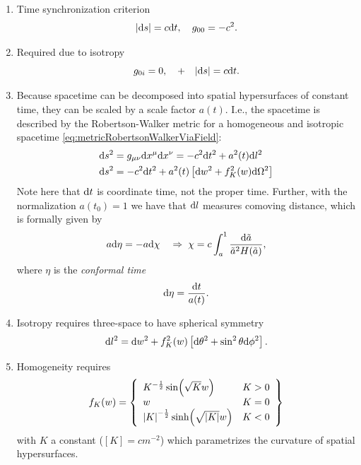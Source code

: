 \begin{enumerate}
	\item Time synchronization criterion \begin{equation}
		\abs{\mathrm{d} s}= c\mathrm{d} t,\quad g_{00} = - c^2.
	\end{equation}
	\item Required due to isotropy
	\begin{equation}
		g_{0i} = 0,\quad +\quad \abs{\mathrm{d} s}=c \mathrm{d} t.
	\end{equation}
	\item Because spacetime can be decomposed into spatial hypersurfaces of constant time, they can be scaled by a scale factor $a(t)$. I.e., the spacetime is described by the Robertson-Walker metric for a homogeneous and isotropic spacetime \ref{eq:metricRobertsonWalkerViaField}:
	\begin{align}
		\mathrm{d} s^2 &= g_{\mu \nu} \mathrm{d} x^\mu \mathrm{d} x^\nu = -c^2 \mathrm{d} t^2+a^2(t) \mathrm{d} l^2 \nonumber \\
		\mathrm{d} s^2 &= -c^2 \mathrm{d} t^2+ a^2(t) \left[\mathrm{d} w^2 + f^2_K(w) \mathrm{d} \Omega^2\right]
	\end{align}
Note here that $\mathrm{d} t$ is coordinate time, not the proper time. Further, with the normalization $a(t_0)=1$ we have that $\mathrm{d} l$ measures comoving distance, which is formally given by
\begin{equation}
\label{eq:conformaldistance}
	a \mathrm{d} \eta = - a \mathrm{d} \chi \quad \Rightarrow \; \chi = c \int_a^1 \frac{\mathrm{d} \tilde{a}}{\tilde{a}^2H(\tilde{a})},
\end{equation}
where $\eta$ is the \emph{conformal time}
\begin{equation}
	\label{eq:conformaltime}
	\mathrm{d} \eta = \frac{\mathrm{d} t}{a(t)}.
\end{equation}
\item Isotropy requires three-space to have spherical symmetry
\begin{equation}
	\mathrm{d} l^2 = \mathrm{d} w^2 + f^2_K(w) \left[\mathrm{d} \theta^2 + \sin^2 \theta \mathrm{d} \phi^2\right].
\end{equation}
\item Homogeneity requires
\begin{equation}
	f_K(w)= \left\{	\begin{array}{lll}
K^{-\frac{1}{2}} \sin(\sqrt{K}w) & K>0 \\
w & K=0\\
\abs{K}^{-\frac{1}{2}} \sinh(\sqrt{\abs{K}} w) & K<0\\
	\end{array}	\right\}
\end{equation}
with $K$ a constant ($[K]=cm^{-2}$) which parametrizes the curvature of spatial hypersurfaces.
\end{enumerate}
